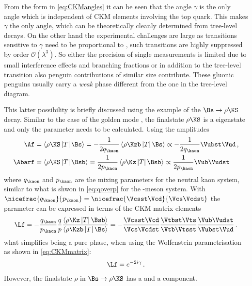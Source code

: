 From the form in \cref{eq:CKMangles} it can be seen that the angle $\gamma$ is the only angle which is independent of CKM elements involving the top quark.
This makes $\gamma$ the only angle, which can be theoretically cleanly determined from tree-level decays.
On the other hand the experimental challenges are large as transitions sensitive to $\gamma$ need to be proportional to \Vub, \ie such transitions are highly suppressed by order $\mathcal{O}\!\left(\lambda^3\right)$.
So either the precision of single measurements is limited due to small interference effects and branching fractions or in addition to the tree-level transition also penguin contributions of similar size contribute.
These gluonic penguins usually carry a \emph{weak} phase different from the one in the tree-level diagram.

This latter possibility is briefly discussed using the example of the $\Bs\to\rho\KS$ decay.
Similar to the case of the golden mode \BdToJPsiKS, the finalstate $\rho\KS$ is a \CP eigenstate and only the parameter \Lf needs to be calculated.
Using the amplitudes
\begin{equation}
\begin{aligned}
\Af&=\left<\rho\KS\left|T\right|\Bs\right>=-\frac{1}{2q_{\kaon}}\left<\rho\Kzb\left|T\right|\Bs\right>\propto-\frac{1}{2q_{\kaon}}\Vubst\Vud\,,\\
\Abarf&=\left<\rho\KS\left|T\right|\Bsb\right>=\frac{1}{2p_{\kaon}}\left<\rho\Kz\left|T\right|\Bsb\right>\propto\frac{1}{2p_{\kaon}}\Vub\Vudst
\end{aligned}
\end{equation}
where $q_{\kaon}$ and $p_{\kaon}$ are the mixing parameters for the neutral kaon system, similar to what is shwon in \cref{eq:qoverp} for the \Bz-meson system.
With $\nicefrac{q_{\kaon}}{p_{\kaon}}=\nicefrac{\Vcsst\Vcd}{\Vcs\Vcdst}$ the parameter \Lf can be expressed in terms of the CKM matrix elements
\begin{equation}
\Lf=-\frac{q_{\kaon}}{p_{\kaon}}\frac{q}{p}\frac{\left<\rho\Kz\left|T\right|\Bsb\right>}{\left<\rho\Kzb\left|T\right|\Bs\right>}
=-\frac{\Vcsst\Vcd}{\Vcs\Vcdst}\frac{\Vtbst\Vts}{\Vtb\Vtsst}\frac{\Vub\Vudst}{\Vubst\Vud}\,.
\end{equation}
what simplifies \Lf being a pure phase, when using the Wolfenstein parametrisation as shown in \cref{eq:CKMmatrix}:
\begin{equation}
\Lf=e^{-2i\gamma}\,.
\end{equation}
However, the finalstate $\rho$ in $\Bs\to\rho\KS$ has a \uquark\uquarkbar and a \dquark\dquarkbar component.
